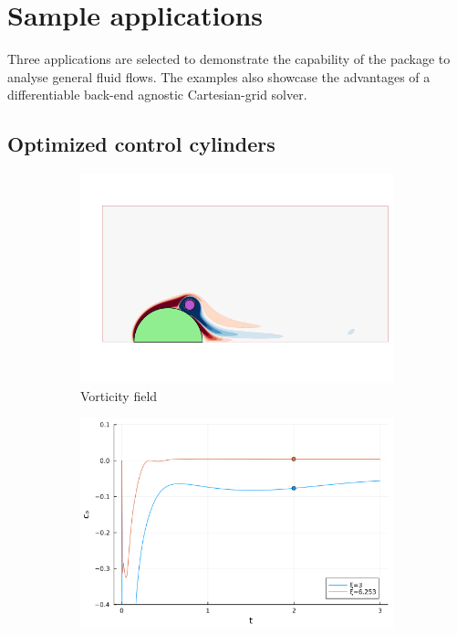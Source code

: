 \documentclass[final,3p,times]{elsarticle}
\begin{document}
\section{Sample applications}\label{sec:applications}
Three applications are selected to demonstrate the capability of the package to analyse general fluid flows. The examples also showcase the advantages of a differentiable back-end agnostic Cartesian-grid solver.

\subsection{Optimized control cylinders}

\begin{figure}
    \centering
    \begin{subfigure}[t]{0.9\linewidth}
        \centering
        \includegraphics[width=\linewidth,trim={50 70 20 200},clip]{jl/examples/SpinCylFlood.png}
        \caption{Vorticity field}
    \end{subfigure}
    \begin{subfigure}[b]{0.45\linewidth}
        \includegraphics[width=\linewidth]{jl/examples/SpinCylHist.png}

\end{subfigure}
\end{figure}
\end{document}
